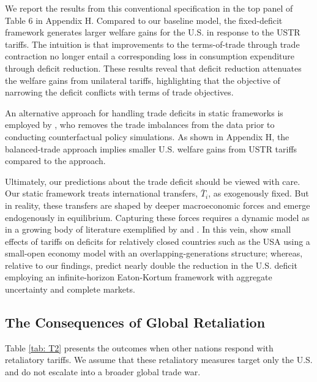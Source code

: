 \documentclass[12pt]{article}
\begin{document}
We report the results from this conventional specification in the top panel of Table 6 in Appendix H. Compared to our baseline model, the fixed-deficit framework generates larger welfare gains for the U.S. in response to the USTR tariffs. The intuition is that improvements to the terms-of-trade through trade contraction no longer entail a corresponding loss in consumption expenditure through deficit reduction. These results reveal that deficit reduction attenuates the welfare gains from unilateral tariffs, highlighting that the objective of narrowing the deficit conflicts with terms of trade objectives.

An alternative approach for handling trade deficits in static frameworks is employed by \citet{Ossa}, who removes the trade imbalances from the data prior to conducting counterfactual policy simulations. As shown in Appendix H, the balanced-trade approach implies smaller U.S. welfare gains from USTR tariffs compared to the  \citet{DEK}  approach.

Ultimately, our predictions about the trade deficit should be viewed with care. Our static framework treats international transfers, $\bar{T}_i$, as exogenously fixed. But in reality, these transfers are shaped by deeper macroeconomic forces and emerge endogenously in equilibrium. Capturing these forces requires a dynamic model as in a growing body of literature exemplified by \citet{Costinot_werning_deficits} and \citet{NBERw33702}. In this vein, \citet{cunatsoe} show small effects of tariffs on deficits for relatively closed countries such as the USA using a small-open economy model with an overlapping-generations structure; whereas, relative to our findings, \citet{caliendo2025} predict nearly double the reduction in the U.S. deficit employing an infinite-horizon Eaton-Kortum framework with aggregate uncertainty and complete markets. 

\subsection{The Consequences of Global Retaliation}
Table \ref{tab: T2} presents the outcomes when other nations respond with retaliatory tariffs. We assume that these retaliatory measures target only the U.S. and do not escalate into a broader global trade war.
\end{document}
